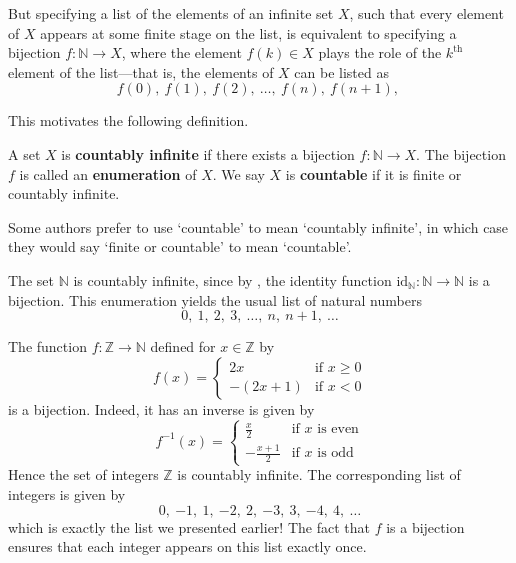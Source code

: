 But specifying a list of the elements of an infinite set $X$, such that every element of $X$ appears at some finite stage on the list, is equivalent to specifying a bijection $f : \mathbb{N} \to X$, where the element $f(k) \in X$ plays the role of the $k^{\text{th}}$ element of the list---that is, the elements of $X$ can be listed as
\[  f(0),~ f(1),~ f(2),~ \dots,~ f(n),~ f(n+1),~ \]

This motivates the following definition.

\begin{definition}
\label{defCountable}
A set $X$ is \textbf{countably infinite} if there exists a bijection $f : \mathbb{N} \to X$. The bijection $f$ is called an \textbf{enumeration} of $X$. We say $X$ is \textbf{countable} if it is finite or countably infinite.
\end{definition}

Some authors prefer to use `countable' to mean `countably infinite', in which case they would say `finite or countable' to mean `countable'.

\begin{example}
\label{exNIsCountable}
The set $\mathbb{N}$ is countably infinite, since by , the identity function $\mathrm{id}_{\mathbb{N}} : \mathbb{N} \to \mathbb{N}$ is a bijection. This enumeration yields the usual list of natural numbers
\[ 0,~ 1,~ 2,~ 3,~ \dots,~ n,~ n+1,~ \dots \]
\end{example}

\begin{example}
\label{exZIsCountable}
The function $f : \mathbb{Z} \to \mathbb{N}$ defined for $x \in \mathbb{Z}$ by
\[ f(x) = \begin{cases} 2x & \text{if } x \ge 0 \\ -(2x+1) & \text{if } x < 0 \end{cases} \]
is a bijection. Indeed, it has an inverse is given by
\[ f^{-1}(x) = \begin{cases} \frac{x}{2} & \text{if } x \text{ is even} \\ -\frac{x+1}{2} & \text{if } x \text{ is odd} \end{cases} \]
Hence the set of integers $\mathbb{Z}$ is countably infinite. The corresponding list of integers is given by
\[ 0,\ {-1},\ 1,\ {-2},\ 2,\ {-3},\ 3,\ {-4},\ 4,\ \dots \]
which is exactly the list we presented earlier! The fact that $f$ is a bijection ensures that each integer appears on this list exactly once.
\end{example}

